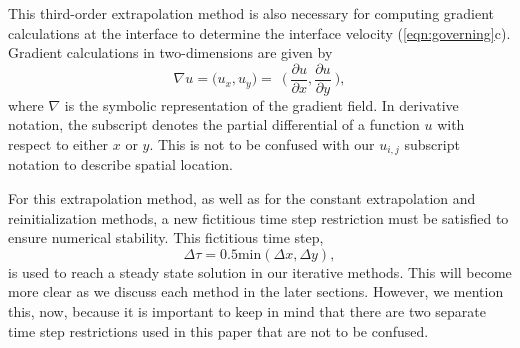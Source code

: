 \documentclass[oneside,12pt,final]{/Applications/TeX/packages/ucthesis-CA2012}
\begin{document}
\begin{mainmatter}
This third-order extrapolation method is also necessary for computing gradient calculations at the interface to determine the interface velocity (\ref{eqn:governing}c). Gradient calculations in two-dimensions are given by 
\begin{equation}
\nabla u  = \bigg( u_x, u_y \bigg) =\>\>  \bigg( \> \frac{\partial u}{\partial x},\frac{\partial u}{\partial y} \> \bigg),
\end{equation}
where $\nabla$ is the symbolic representation of the gradient field. In derivative notation, the subscript denotes the partial differential of a function $u$ with respect to either $x$ or $y$. This is not to be confused with our $u_{i,j}$ subscript notation to describe spatial location.

For this extrapolation method, as well as for the constant extrapolation and reinitialization methods, a new fictitious time step restriction must be satisfied to ensure numerical stability. This fictitious time step,
\begin{equation}\label{eqn:time_step_restriction_2}
\Delta \tau = 0.5 \text{min} (\Delta x,\Delta y),
\end{equation}
is used to reach a steady state solution in our iterative methods. This will become more clear as we discuss each method in the later sections. However, we mention this, now, because it is important to keep in mind that there are two separate time step restrictions used in this paper that are not to be confused.


\end{mainmatter}
\end{document}

